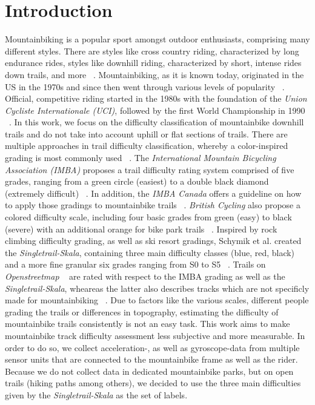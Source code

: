 \documentclass[runningheads]{llncs}
\begin{document}
\section{Introduction}
Mountainbiking is a popular sport amongst outdoor enthusiasts, comprising many different styles.
There are styles like cross country riding, characterized by long endurance rides, styles like downhill riding, characterized by short, intense rides down trails, and more ~\cite{ucidisciplines}.
Mountainbiking, as it is known today, originated in the US in the 1970s and since then went through various levels of popularity ~\cite{gaulrapp2001injuries}.
Official, competitive riding started in the 1980s with the foundation of the \textit{Union Cycliste Internationale (UCI)}, followed by the first World Championship in 1990 ~\cite{impellizzeri2007physiology}. 
In this work, we focus on the difficulty classification of mountainbike downhill trails and do not take into account uphill or flat sections of trails.
There are multiple approaches in trail difficulty classification, whereby a color-inspired grading is most commonly used ~\cite{imbarating,britishcyclinggrades,schymik2008singletrail}.
The \textit{International Mountain Bicycling Association (IMBA)} proposes a trail difficulty rating system comprised of five grades, ranging from a green circle (easiest) to a double black diamond (extremely difficult) ~\cite{imbarating}. 
In addition, the \textit{IMBA Canada} offers a guideline on how to apply those gradings to mountainbike trails ~\cite{imbaguidelines}.
\textit{British Cycling} also propose a colored difficulty scale, including four basic grades from green (easy) to black (severe) with an additional orange for bike park trails ~\cite{britishcyclinggrades}.
Inspired by  rock climbing difficulty grading, as well as ski resort gradings, Schymik et al. created the \textit{Singletrail-Skala}, containing three main difficulty classes (blue, red, black) and a more fine granular six grades ranging from S0 to S5 ~\cite{schymik2008singletrail}. 
Trails on \textit{Openstreetmap} ~\cite{openstreetmap} are rated with respect to the IMBA grading as well as the \textit{Singletrail-Skala}, wheareas the latter also describes tracks which are not specificly made for mountainbiking ~\cite{osmsingletrails}. 
Due to factors like the various scales, different people grading the trails or differences in topography, estimating the difficulty of mountainbike trails consistently is not an easy task.
This work aims to make mountainbike track difficulty assessment less subjective and more measurable.
In order to do so, we collect acceleration-, as well as gyroscope-data from multiple sensor units that are connected to the mountainbike frame as well as the rider.
Because we do not collect data in dedicated mountainbike parks, but on open trails (hiking paths among others), we decided to use the three main difficulties given by the \textit{Singletrail-Skala} as the set of labels.
\end{document}
